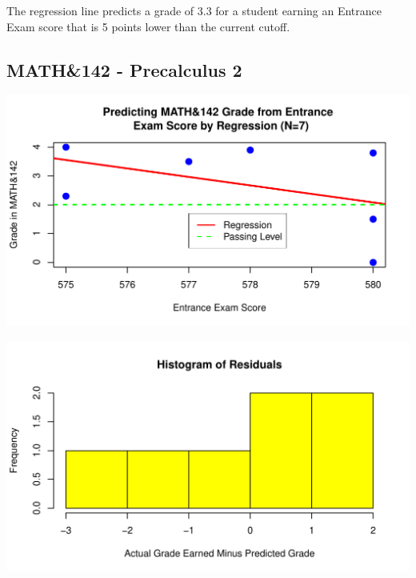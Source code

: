 \documentclass[twoside]{article}\usepackage[]{graphicx}\usepackage[]{color}
\makeatletter
\def\maxwidth{ %
  \ifdim\Gin@nat@width>\linewidth
    \linewidth
  \else
    \Gin@nat@width
  \fi
}
\newenvironment{knitrout}{}{} %
\makeatother
\begin{document}
The regression line predicts a grade of 3.3 for a student earning an Entrance Exam score that is 5 points lower than the current cutoff.


\newpage
\subsection{MATH\&142 - Precalculus 2}




\begin{knitrout}
\color{fgcolor}
\includegraphics[width=\maxwidth]{figure/142regressiongraph-1} 

\end{knitrout}

\begin{knitrout}
\color{fgcolor}
\includegraphics[width=\maxwidth]{figure/142residualsplot-1} 

\end{knitrout}
\end{document}
